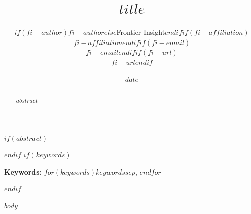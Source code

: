 \documentclass[10pt,letterpaper]{article}
\title{$title$}
\author{$if(fi-author)$$fi-author$$else$Frontier Insight$endif$$if(fi-affiliation)$\\{\small $fi-affiliation$}$endif$$if(fi-email)$\\{\small $fi-email$}$endif$$if(fi-url)$\\{\small $fi-url$}$endif$}
\date{$date$}
\begin{document}
\maketitle

$if(abstract)$
\begin{abstract}
$abstract$
\end{abstract}
$endif$
$if(keywords)$
{\small\raggedright\noindent\textbf{Keywords:} $for(keywords)$$keywords$$sep$, $endfor$\par}\medskip
$endif$

$body$
\end{document}
